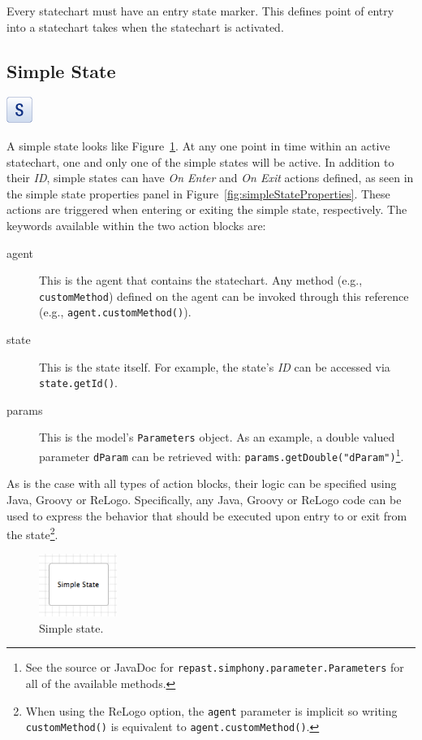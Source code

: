 \documentclass[11pt]{amsart}
\begin{document}
Every statechart must have an entry state marker. This defines point of entry into a statechart takes when the statechart is activated.

\subsection{Simple State}
\label{sec:simpleState}
\includegraphics[height=.2in]{StatechartsImages/State-32.png}

A simple state looks like Figure~\ref{fig:simpleState}. At any one point in time within an active statechart, one and only one of the simple states will be active. In addition to their \emph{ID}, simple states can have \emph{On Enter} and \emph{On Exit} actions defined, as seen in the simple state properties panel in Figure~\ref{fig:simpleStateProperties}. These actions are triggered when entering or exiting the simple state, respectively. The keywords available within the two action blocks are:
\begin{description}
\item[agent] This is the agent that contains the statechart. Any method (e.g., \texttt{customMethod}) defined on the agent can be invoked through this reference (e.g., \texttt{agent.customMethod()}).
\item[state] This is the state itself. For example, the state's \emph{ID} can be accessed via \texttt{state.getId()}.
\item[params] This is the model's \texttt{Parameters} object. As an example, a double valued parameter \texttt{dParam} can be retrieved with: \texttt{params.getDouble("dParam")}\footnote{See the source or JavaDoc for  \texttt{repast.simphony.parameter.Parameters} for all of the available methods.}.
\end{description}

As is the case with all types of action blocks, their logic can be specified using Java, Groovy or ReLogo. Specifically, any Java, Groovy or ReLogo code can be used to express the behavior that should be executed upon entry to or exit from the state\footnote{When using the ReLogo option, the \texttt{agent} parameter is implicit so writing \texttt{customMethod()} is equivalent to \texttt{agent.customMethod()}.}.

\begin{figure}
\begin{center}
\vspace{.2in}
\centerline {
\includegraphics[width=1in]{StatechartsImages/SimpleState.png}
}
\caption{Simple state.}
\label{fig:simpleState}
\end{center}
\end{figure}
\end{document}
